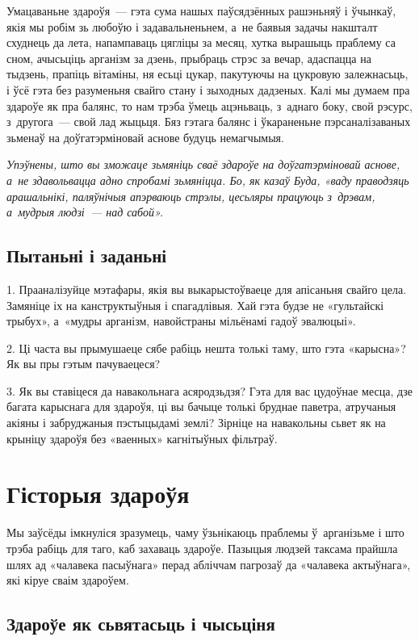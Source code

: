 Умацаваньне здароўя~--- гэта сума нашых паўсядзённых рашэньняў і ўчынкаў, якія мы робім зь любоўю і задавальненьнем, а~не баявыя задачы накшталт схуднець да лета, напампаваць цягліцы за месяц, хутка вырашыць праблему са сном, ачысьціць арганізм за дзень, прыбраць стрэс за вечар, адаспацца на тыдзень, прапіць вітаміны, ня есьці цукар, пакутуючы на цукровую залежнасьць, і ўсё гэта без разуменьня свайго стану і зыходных дадзеных. Калі мы думаем пра здароўе як пра балянс, то нам трэба ўмець ацэньваць, з~аднаго боку, свой рэсурс, з~другога~--- свой лад жыцьця. Бяз гэтага балянс і ўкараненьне пэрсаналізаваных зьменаў на доўгатэрміновай аснове будуць немагчымыя.

\emph{Упэўнены, што вы зможаце зьмяніць сваё здароўе на доўгатэрміновай аснове, а~не здавольвацца адно спробамі зьмяніцца. Бо, як казаў Буда, «ваду праводзяць арашальнікі, паляўнічыя апэрваюць стрэлы, цесьляры працуюць з~дрэвам, а~мудрыя людзі~--- над сабой».}

\subsection*{Пытаньні і заданьні}

1. Прааналізуйце мэтафары, якія вы выкарыстоўваеце для апісаньня свайго цела. Замяніце іх на канструктыўныя і спагадлівыя. Хай гэта будзе не «гультайскі трыбух», а~«мудры арганізм, навойстраны мільёнамі гадоў эвалюцыі».

2. Ці часта вы прымушаеце сябе рабіць нешта толькі таму, што гэта «карысна»? Як вы пры гэтым пачуваецеся?

3. Як вы ставіцеся да навакольнага асяродзьдзя? Гэта для вас цудоўнае месца, дзе багата карыснага для здароўя, ці вы бачыце толькі бруднае паветра, атручаныя акіяны і забруджаныя пэстыцыдамі землі? Зірніце на навакольны сьвет як на крыніцу здароўя без «ваенных» кагнітыўных фільтраў.


\section{Гісторыя здароўя}

Мы заўсёды імкнуліся зразумець, чаму ўзьнікаюць праблемы ў~арганізьме і што трэба рабіць для таго, каб захаваць здароўе. Пазыцыя людзей таксама прайшла шлях ад «чалавека пасыўнага» перад абліччам пагрозаў да «чалавека актыўнага», які кіруе сваім здароўем.

\subsection*{Здароўе як сьвятасьць і чысьціня}

